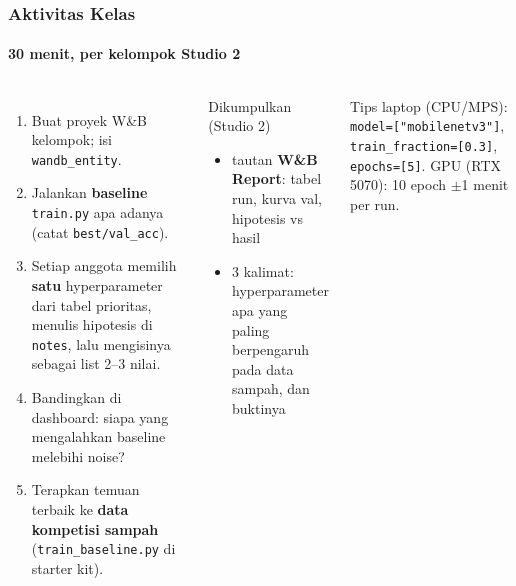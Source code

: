 \documentclass[t,aspectratio=169,xcolor={dvipsnames,table}]{beamer}
\begin{document}
\begin{frame}
    \frametitle{Aktivitas Kelas}
    \framesubtitle{30 menit, per kelompok Studio 2}
    \footnotesize

    \begin{columns}[T]
        \begin{enumerate}
            \item Buat proyek W\&B kelompok; isi \texttt{wandb\_entity}.
            \item Jalankan \textbf{baseline} \texttt{train.py} apa adanya (catat \texttt{best/val\_acc}).
            \item Setiap anggota memilih \textbf{satu} hyperparameter dari tabel prioritas, menulis hipotesis di \texttt{notes}, lalu mengisinya sebagai list 2--3 nilai.
            \item Bandingkan di dashboard: siapa yang mengalahkan baseline melebihi noise?
            \item Terapkan temuan terbaik ke \textbf{data kompetisi sampah} (\texttt{train\_baseline.py} di starter kit).
        \end{enumerate}

        \begin{exampleblock}{Dikumpulkan (Studio 2)}
            \begin{itemize}
                \item tautan \textbf{W\&B Report}: tabel run, kurva val, hipotesis vs hasil
                \item 3 kalimat: hyperparameter apa yang paling berpengaruh pada data sampah, dan buktinya
            \end{itemize}
        \end{exampleblock}
        {\scriptsize\color{dlMute} Tips laptop (CPU/MPS): \texttt{model=["mobilenetv3"]}, \texttt{train\_fraction=[0.3]}, \texttt{epochs=[5]}. GPU (RTX 5070): 10 epoch $\pm$1 menit per run.}
    \end{columns}
\end{frame}
\end{document}
